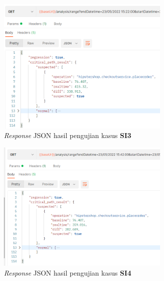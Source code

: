 
\begin{figure}[!htb]
	\centering
	\includegraphics[width=0.75\textwidth]{resources/ch4/json/3-new.png}
	\caption{\textit{Response} JSON hasil pengujian kasus \textbf{SI3}}
	\label{result_json_3}
\end{figure}


\begin{figure}[!htb]
	\centering
	\includegraphics[width=0.75\textwidth]{resources/ch4/json/4-new.png}
	\caption{\textit{Response} JSON hasil pengujian kasus \textbf{SI4}}
	\label{result_json_4}
\end{figure}

